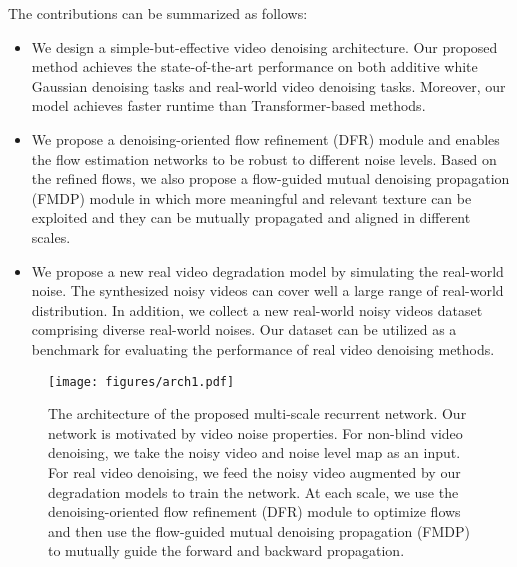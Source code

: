 \documentclass[10pt,twocolumn,letterpaper]{article}
\newlength \g
\begin{document}
The contributions can be summarized as follows:
\vspace{-0.2cm}
\begin{itemize} \item We design a simple-but-effective video denoising architecture. Our proposed method achieves the state-of-the-art performance on both additive white Gaussian denoising tasks and real-world video denoising tasks. Moreover, our model achieves faster runtime than Transformer-based methods.



    
    \vspace{-0.2cm}
    \item We propose a denoising-oriented flow refinement (DFR) module and enables the flow estimation networks to be robust to different noise levels.
    Based on the refined flows, we also propose a flow-guided mutual denoising propagation (FMDP) module in which more meaningful and relevant texture can be exploited and they can be mutually propagated and aligned in different scales.


    
\vspace{-0.2cm}
    \item We propose a new real video degradation model by simulating the real-world noise. The synthesized noisy videos can cover well a large range of real-world distribution. In addition, we collect a new real-world noisy videos dataset comprising diverse real-world noises. Our dataset can be utilized as a benchmark for evaluating the performance of real video denoising methods.

\end{itemize}

\begin{figure*}
  \begin{center}
  \vspace{-2mm}
  \texttt{[image: figures/arch1.pdf]}
  \end{center}
\caption{The architecture of the proposed multi-scale recurrent network. Our network is motivated by video noise properties. For non-blind video denoising, we take the noisy video and noise level map as an input. For real video denoising, we feed the noisy video augmented by our degradation models to train the network. At each scale, we use the denoising-oriented flow refinement (DFR) module to optimize flows and then use the flow-guided mutual denoising propagation (FMDP) to mutually guide the forward and backward propagation. }\label{fig:arch}
\end{figure*}
\end{document}
